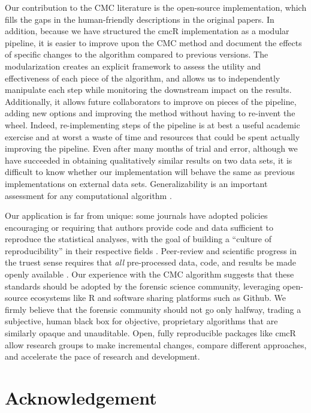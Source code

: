 \documentclass[11pt,]{isuthesis}
\begin{document}
Our contribution to the CMC literature is the open-source implementation, which fills the gaps in the human-friendly descriptions in the original papers.
In addition, because we have structured the cmcR implementation as a modular pipeline, it is easier to improve upon the CMC method and document the effects of specific changes to the algorithm compared to previous versions.
The modularization creates an explicit framework to assess the utility and effectiveness of each piece of the algorithm, and allows us to independently manipulate each step while monitoring the downstream impact on the results.
Additionally, it allows future collaborators to improve on pieces of the pipeline, adding new options and improving the method without having to re-invent the wheel.
Indeed, re-implementing steps of the pipeline is at best a useful academic exercise and at worst a waste of time and resources that could be spent actually improving the pipeline.
Even after many months of trial and error, although we have succeeded in obtaining qualitatively similar results on two data sets, it is difficult to know whether our implementation will behave the same as previous implementations on external data sets.
Generalizability is an important assessment for any computational algorithm \citep{vanderplasComparisonThreeSimilarity2020}.

Our application is far from unique: some journals have adopted policies encouraging or requiring that authors provide code and data sufficient to reproduce the statistical analyses, with the goal of building a ``culture of reproducibility'' in their respective fields \citep{peng_reproducible_2009, peng_reproducible_2011, stodden_toward_2013}.
Peer-review and scientific progress in the truest sense requires that \emph{all} pre-processed data, code, and results be made openly available \citep{kwongAlgorithmSaysYou2017, desaiTrustVerifyGuide2017}.
Our experience with the CMC algorithm suggests that these standards should be adopted by the forensic science community, leveraging open-source ecosystems like R and software sharing platforms such as Github.
We firmly believe that the forensic community should not go only halfway, trading a subjective, human black box for objective, proprietary algorithms that are similarly opaque and unauditable.
Open, fully reproducible packages like cmcR allow research groups to make incremental changes, compare different approaches, and accelerate the pace of research and development.

\hypertarget{acknowledgement}{%
\section{Acknowledgement}\label{acknowledgement}}
\end{document}

